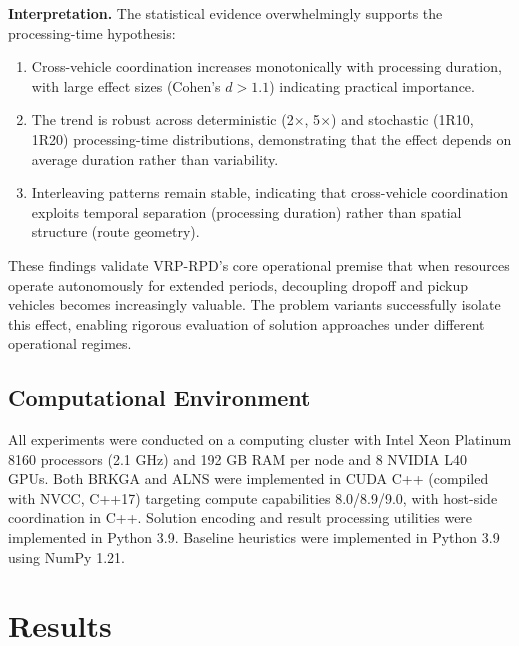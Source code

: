 \documentclass{article}
\begin{document}
\textbf{Interpretation.} The statistical evidence overwhelmingly supports the processing-time hypothesis:

\begin{enumerate}
\item Cross-vehicle coordination increases monotonically with processing duration, with large effect sizes (Cohen's $d > 1.1$) indicating practical importance.

\item The trend is robust across deterministic (2$\times$, 5$\times$) and stochastic (1R10, 1R20) processing-time distributions, demonstrating that the effect depends on average duration rather than variability.

\item Interleaving patterns remain stable, indicating that cross-vehicle coordination exploits temporal separation (processing duration) rather than spatial structure (route geometry).

\end{enumerate}

These findings validate VRP-RPD's core operational premise that when resources operate autonomously for extended periods, decoupling dropoff and pickup vehicles becomes increasingly valuable. The problem variants successfully isolate this effect, enabling rigorous evaluation of solution approaches under different operational regimes.

\subsection{Computational Environment}

All experiments were conducted on a computing cluster with Intel Xeon Platinum 8160 processors (2.1 GHz) and 192 GB RAM per node and 8 NVIDIA L40 GPUs. Both BRKGA and ALNS were implemented in CUDA C++ (compiled with NVCC, C++17) targeting compute capabilities 8.0/8.9/9.0, with host-side coordination in C++. Solution encoding and result processing utilities were implemented in Python 3.9. Baseline heuristics were implemented in Python 3.9 using NumPy 1.21.

\section{Results}
\label{sec:results}
\end{document}
